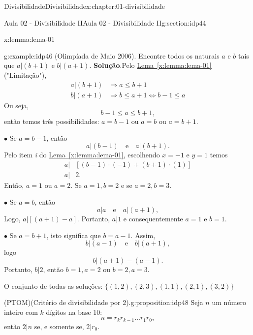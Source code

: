\documentclass[oneside,10pt,]{book}
\newcommand{\blocktitlefont}{\relax}
\newcommand{\xreffont}{\relax}
\numberwithin{equation}{section}
\newcommand{\amp}{&}
\begin{document}
\begin{chapterptx}{Divisibilidade}{}{Divisibilidade}{}{}{x:chapter:01-divisibilidade}
\begin{sectionptx}{Aula 02 - Divisibilidade II}{}{Aula 02 - Divisibilidade II}{}{}{g:section:idp44}
\begin{lemma}{}{}{x:lemma:lema-01}
\end{lemma}
\begin{example}{}{g:example:idp46}%
(Olimpíada de Maio 2006). Encontre todos os naturais \(a\) e \(b\) tais que \(a|(b + 1)\) e \(b|(a + 1)\).%
\textbf{\blocktitlefont Solução}.\hypertarget{g:solution:idp47}{}\quad{}Pelo \hyperref[x:lemma:lema-01]{Lema~{\xreffont\ref{x:lemma:lema-01}}} ("Limitação"),%
\begin{align*}
a|(b+1) \amp\Rightarrow a\leq b+1\\
b|(a+1) \amp\Rightarrow b\leq a+1 \Leftrightarrow b-1\leq a
\end{align*}
Ou seja,%
\begin{equation*}
b-1\leq a\leq b+1,
\end{equation*}
então temos três possibilidades: \(a=b-1\) ou \(a=b\) ou \(a=b+1\).%
\par
\(\bullet\) Se \(a=b-1\), então%
\begin{equation*}
a|(b-1)\quad \text{e}\quad a|(b+1).
\end{equation*}
Pelo item \emph{i} do \hyperref[x:lemma:lema-01]{Lema~{\xreffont\ref{x:lemma:lema-01}}}, escolhendo \(x=-1\) e \(y=1\) temos%
\begin{align*}
a|\amp[(b-1)\cdot(-1) + (b+1)\cdot(1)]\\
a|\amp 2.
\end{align*}
Então, \(a=1\) ou \(a=2\). Se \(a=1, b=2\) e se \(a=2, b=3\).%
\par
\(\bullet\) Se \(a=b\), então%
\begin{equation*}
a|a\quad \text{e}\quad a|(a+1),
\end{equation*}
Logo, \(a|[(a+1)-a].\) Portanto, \(a|1\) e consequentemente \(a=1\) e \(b=1\).%
\par
\(\bullet\) Se \(a=b+1\), isto significa que \(b=a-1\). Assim,%
\begin{equation*}
b|(a-1)\quad \text{e}\quad b|(a+1),
\end{equation*}
logo%
\begin{equation*}
b|(a+1)-(a-1).
\end{equation*}
Portanto, \(b|2\), então \(b=1, a=2\) ou \(b=2, a=3\).%
\par
O conjunto de todas as soluções: \(\{(1,2),(2,3), (1,1), (2,1), (3,2)\}\)%
\end{example}
\begin{proposition}{(PTOM)(Critério de divisibilidade por 2).}{}{g:proposition:idp48}%
Seja \(n\) um número inteiro com \(k\) dígitos na base \(10\):%
\begin{equation*}
n=r_kr_{k-1}\ldots r_1r_0,
\end{equation*}
então \(2|n\) se, e somente se, \(2|r_0\).%
\end{proposition}
\end{sectionptx}
\end{chapterptx}
\end{document}
